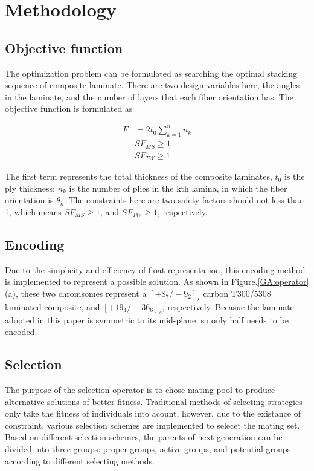 \section{Methodology}
\subsection{Objective function}
The optimization problem can be formulated as searching the optimal stacking
sequence of composite laminate.  There are two design variables here, the angles
in the laminate, and the number of layers that each fiber orientation has. The
objective function is formulated as

\begin{equation}
	\begin{split}
    	F  &= 2t_0 \sum_{k=1}^n n_k  \\
    	   &SF_{MS} \geq 1  \\
    	   &SF_{TW} \geq 1 
	\end{split}
\end{equation}

The first term represents the total thickness of the composite laminates, $t_0$
is the ply thickness; $n_k$ is the number of plies in the kth lamina, in which
the fiber orientation is $\theta_k$. The constraints here are two safety
factors should not less than 1, which means  $SF_{MS} \geq 1$, and $SF_{TW} \geq
1$, respectively.

\subsection{Encoding}
Due to the simplicity and efficiency of float representation, this encoding
method is implemented to represent a possible solution. As shown in Figure.\ref{GA:operator}
 (a), these two chromsomes represent a $[+8_{7}/-9_{2}]_s$
carbon T300/5308 laminated composite, and $[+19_{4}/-36_{6}]_s$, respectively.
Becasue the laminate adopted in this paper is symmetric to its mid-plane, so
only half needs to be encoded.

\subsection{Selection}
The purpose of the selection operator is to chose mating pool to produce
alternative solutions of better fitness. Traditional methods of selecting
strategies only take the fitness of individuals into acount, however, due to 
the existance of constraint, various selection schemes are implemented to
selecet the mating set. Based on different selection schemes, the parents of
next generation can be divided into  three groups: proper groups, active groups,
and potential groups according to different selecting methods. 

